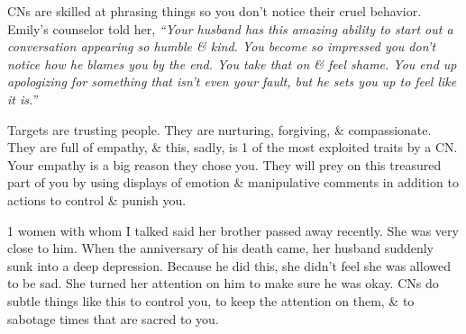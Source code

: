 \documentclass{article}
\numberwithin{equation}{section}
\begin{document}
CNs are skilled at phrasing things so you don't notice their cruel behavior. Emily's counselor told her, \textit{``Your husband has this amazing ability to start out a conversation appearing so humble \& kind. You become so impressed you don't notice how he blames you by the end. You take that on \& feel shame. You end up apologizing for something that isn't even your fault, but he sets you up to feel like it is.''}

Targets are trusting people. They are nurturing, forgiving, \& compassionate. They are full of empathy, \& this, sadly, is 1 of the most exploited traits by a CN. Your empathy is a big reason they chose you. They will prey on this treasured part of you by using displays of emotion \& manipulative comments in addition to actions to control \& punish you.

1 women with whom I talked said her brother passed away recently. She was very close to him. When the anniversary of his death came, her husband suddenly sunk into a deep depression. Because he did this, she didn't feel she was allowed to be sad. She turned her attention on him to make sure he was okay. CNs do subtle things like this to control you, to keep the attention on them, \& to sabotage times that are sacred to you.
\end{document}
